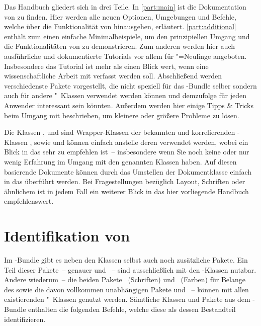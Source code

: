 Das Handbuch gliedert sich in drei Teile. In \autoref{part:main} ist die 
Dokumentation von \TUDScript zu finden. Hier werden alle neuen Optionen, 
Umgebungen und Befehle, welche über die Funktionalität von \KOMAScript 
hinausgehen, erläutert. \autoref{part:additional} enthält zum einen einfache 
Minimalbeispiele, um den prinzipiellen Umgang und die Funktionalitäten von 
\TUDScript zu demonstrieren. Zum anderen werden hier auch ausführliche und 
dokumentierte Tutorials vor allem für "=Neulinge angeboten. 
Insbesondere das Tutorial  ist mehr als einen Blick wert, 
wenn eine wissenschaftliche Arbeit mit  verfasst werden soll.
Abschließend werden verschiedenste Pakete vorgestellt, die nicht speziell für 
das \TUDScript-Bundle selber sondern auch für andere "~Klassen
verwendet werden können und demzufolge für jeden Anwender interessant sein 
könnten. Außerdem werden hier einige Tipps \& Tricks beim Umgang mit 
 beschrieben, um kleinere oder größere Probleme zu lösen.

Die Klassen ,  und  
sind Wrapper-Klassen der bekannten und korrelierenden \KOMAScript-Klassen 
,  sowie  und können einfach 
anstelle deren verwendet werden, wobei ein Blick in das \scrguide sehr zu 
empfehlen ist~-- insbesondere wenn Sie noch keine oder nur wenig Erfahrung im 
Umgang mit den genannten Klassen haben. Auf diesen basierende Dokumente können 
durch das Umstellen der Dokumentklasse einfach in das \TUDCD überführt werden. 
Bei Fragestellungen bezüglich Layout, Schriften oder ähnlichem ist in jedem 
Fall ein weiterer Blick in das hier vorliegende Handbuch empfehlenswert.



\section{Identifikation von \TUDScript}

Im \TUDScript-Bundle gibt es neben den Klassen selbst auch noch zusätzliche 
Pakete. Ein Teil dieser Pakete~-- genauer  und 
~-- sind ausschließlich mit den \TUDScript-Klassen nutzbar.
Andere wiederum~-- die beiden Pakete ~(Schriften) und 
~(Farben) für Belange des \CDs sowie die davon vollkommen 
unabhängigen Pakete  und ~-- können mit 
allen existierenden "~Klassen genutzt werden. Sämtliche 
Klassen und Pakete aus dem \TUDScript-Bundle enthalten die folgenden Befehle, 
welche diese als dessen Bestandteil identifizieren.

